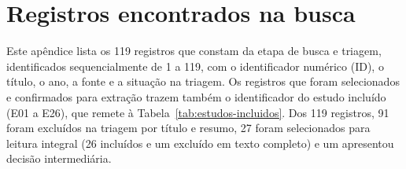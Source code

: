 \chapter{Registros encontrados na busca}
\label{apend:registros}

Este apêndice lista os 119 registros que constam da etapa de busca e triagem, identificados sequencialmente de 1 a 119, com o identificador numérico (ID), o título, o ano, a fonte e a situação na triagem. Os registros que foram selecionados e confirmados para extração trazem também o identificador do estudo incluído (E01 a E26), que remete à Tabela~\ref{tab:estudos-incluidos}. Dos 119 registros, 91 foram excluídos na triagem por título e resumo, 27 foram selecionados para leitura integral (26 incluídos e um excluído em texto completo) e um apresentou decisão intermediária.

